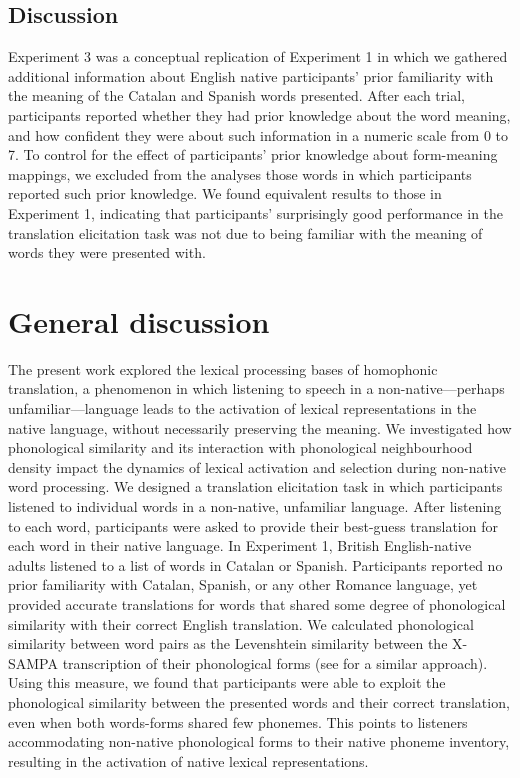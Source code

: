 \documentclass[
  man,
  longtable,
  nolmodern,
  notxfonts,
  notimes,
  colorlinks=true,linkcolor=blue,citecolor=blue,urlcolor=blue]{apa7}
\begin{document}
\subsection{Discussion}\label{discussion-2}

Experiment 3 was a conceptual replication of Experiment 1 in which we
gathered additional information about English native participants' prior
familiarity with the meaning of the Catalan and Spanish words presented.
After each trial, participants reported whether they had prior knowledge
about the word meaning, and how confident they were about such
information in a numeric scale from 0 to 7. To control for the effect of
participants' prior knowledge about form-meaning mappings, we excluded
from the analyses those words in which participants reported such prior
knowledge. We found equivalent results to those in Experiment 1,
indicating that participants' surprisingly good performance in the
translation elicitation task was not due to being familiar with the
meaning of words they were presented with.

\section{General discussion}\label{general-discussion}

The present work explored the lexical processing bases of homophonic
translation, a phenomenon in which listening to speech in a
non-native---perhaps unfamiliar---language leads to the activation of
lexical representations in the native language, without necessarily
preserving the meaning. We investigated how phonological similarity and
its interaction with phonological neighbourhood density impact the
dynamics of lexical activation and selection during non-native word
processing. We designed a translation elicitation task in which
participants listened to individual words in a non-native, unfamiliar
language. After listening to each word, participants were asked to
provide their best-guess translation for each word in their native
language. In Experiment 1, British English-native adults listened to a
list of words in Catalan or Spanish. Participants reported no prior
familiarity with Catalan, Spanish, or any other Romance language, yet
provided accurate translations for words that shared some degree of
phonological similarity with their correct English translation. We
calculated phonological similarity between word pairs as the Levenshtein
similarity between the X-SAMPA transcription of their phonological forms
(see  for a
similar approach). Using this measure, we found that participants were
able to exploit the phonological similarity between the presented words
and their correct translation, even when both words-forms shared few
phonemes. This points to listeners accommodating non-native phonological
forms to their native phoneme inventory, resulting in the activation of
native lexical representations.
\end{document}
